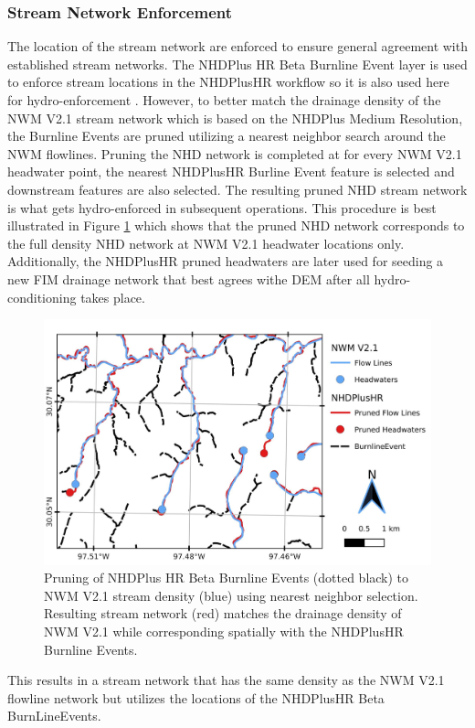 \subsubsection{Stream Network Enforcement} 
\label{ssec:stream_network_enforcment}
%
The location of the stream network are enforced to ensure general agreement with established stream networks.
The NHDPlus HR Beta Burnline Event layer is used to enforce stream locations in the NHDPlusHR workflow so it is also used here for hydro-enforcement \cite{moore2019user}. 
However, to better match the drainage density of the NWM V2.1 stream network which is based on the NHDPlus Medium Resolution, the Burnline Events are pruned utilizing a nearest neighbor search around the NWM flowlines. 
Pruning the NHD network is completed at for every NWM V2.1 headwater point, the nearest NHDPlusHR Burline Event feature is selected and downstream features are also selected.
The resulting pruned NHD stream network is what gets hydro-enforced in subsequent operations.
This procedure is best illustrated in Figure \ref{fig:stream_density_pruning} which shows that the pruned NHD network corresponds to the full density NHD network at NWM V2.1 headwater locations only. 
Additionally, the NHDPlusHR pruned headwaters are later used for seeding a new FIM drainage network that best agrees withe DEM after all hydro-conditioning takes place.
%
\begin{figure}[h!]
\centering
\includegraphics[scale=1.0]{figures/headwaters.jpg}
\caption{Pruning of NHDPlus HR Beta Burnline Events (dotted black) to NWM V2.1 stream density (blue) using nearest neighbor selection. Resulting stream network (red) matches the drainage density of NWM V2.1 while corresponding spatially with the NHDPlusHR Burnline Events.}
\label{fig:stream_density_pruning}
\end{figure}
%
This results in a stream network that has the same density as the NWM V2.1 flowline network but utilizes the locations of the NHDPlusHR Beta BurnLineEvents. 

